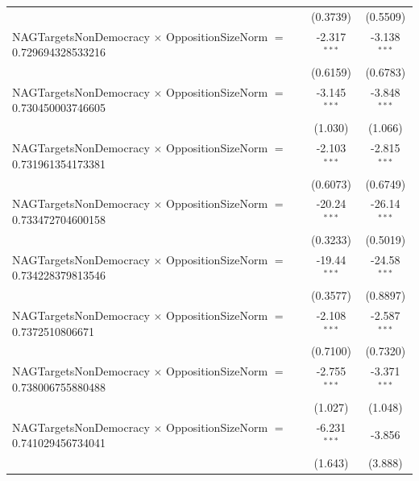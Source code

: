 \begin{tabular}{lcc}
                                                                                & (0.3739)             & (0.5509)\\   
   NAGTargetsNonDemocracy $\times$ OppositionSizeNorm $=$ 0.729694328533216     & -2.317$^{***}$       & -3.138$^{***}$\\   
                                                                                & (0.6159)             & (0.6783)\\   
   NAGTargetsNonDemocracy $\times$ OppositionSizeNorm $=$ 0.730450003746605     & -3.145$^{***}$       & -3.848$^{***}$\\   
                                                                                & (1.030)              & (1.066)\\   
   NAGTargetsNonDemocracy $\times$ OppositionSizeNorm $=$ 0.731961354173381     & -2.103$^{***}$       & -2.815$^{***}$\\   
                                                                                & (0.6073)             & (0.6749)\\   
   NAGTargetsNonDemocracy $\times$ OppositionSizeNorm $=$ 0.733472704600158     & -20.24$^{***}$       & -26.14$^{***}$\\   
                                                                                & (0.3233)             & (0.5019)\\   
   NAGTargetsNonDemocracy $\times$ OppositionSizeNorm $=$ 0.734228379813546     & -19.44$^{***}$       & -24.58$^{***}$\\   
                                                                                & (0.3577)             & (0.8897)\\   
   NAGTargetsNonDemocracy $\times$ OppositionSizeNorm $=$ 0.7372510806671       & -2.108$^{***}$       & -2.587$^{***}$\\   
                                                                                & (0.7100)             & (0.7320)\\   
   NAGTargetsNonDemocracy $\times$ OppositionSizeNorm $=$ 0.738006755880488     & -2.755$^{***}$       & -3.371$^{***}$\\   
                                                                                & (1.027)              & (1.048)\\   
   NAGTargetsNonDemocracy $\times$ OppositionSizeNorm $=$ 0.741029456734041     & -6.231$^{***}$       & -3.856\\   
                                                                                & (1.643)              & (3.888)\\   

\end{tabular}
